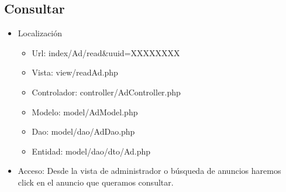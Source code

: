 \subsection{Consultar}
\begin{itemize}
\item Localizaci\'{o}n
\begin{itemize}
\item Url: index/Ad/read\&uuid=XXXXXXXX
\item Vista: view/readAd.php
\item Controlador: controller/AdController.php
\item Modelo: model/AdModel.php
\item Dao: model/dao/AdDao.php
\item Entidad: model/dao/dto/Ad.php
\end{itemize}
\item Acceso: Desde la vista de administrador o b\'{u}squeda de anuncios haremos click en el anuncio que queramos consultar.
\end{itemize}